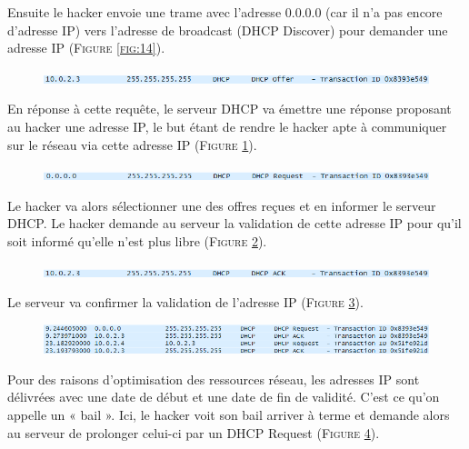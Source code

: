 \documentclass[11pt]{article}
\begin{document}
Ensuite le hacker envoie une trame avec l’adresse 0.0.0.0 (car il n’a pas encore d’adresse IP) vers l’adresse de broadcast (DHCP Discover) pour demander une adresse IP  (\textsc{Figure \ref{fig:14}}).

\begin{figure}[h!]
        \centering \includegraphics[scale=0.9]{Exo3/15.png}
        \caption{}
         \label{fig:15}
\end{figure}

En réponse à cette requête, le serveur DHCP va émettre une réponse proposant au hacker une adresse IP, le but étant de rendre le hacker apte à communiquer sur le réseau via cette adresse IP (\textsc{Figure \ref{fig:15}}).

\begin{figure}[h!]
        \centering \includegraphics[scale=0.9]{Exo3/16.png}
        \caption{}
        \label{fig:16}
\end{figure}

Le hacker va alors sélectionner une des offres reçues et en informer le serveur DHCP. Le hacker demande au serveur la validation de cette adresse IP pour qu’il soit informé qu’elle n’est plus libre (\textsc{Figure \ref{fig:16}}).
\vspace{0cm}
\begin{figure}[h!]
        \centering \includegraphics[scale=0.9]{Exo3/17.png}
        \caption{}
         \label{fig:17}
\end{figure}

Le serveur va confirmer la validation de l’adresse IP (\textsc{Figure \ref{fig:17}}).

\begin{figure}[h!]
        \centering \includegraphics[scale=0.8]{Exo3/18.png}
        \caption{}
         \label{fig:18}
\end{figure}

Pour des raisons d’optimisation des ressources réseau, les adresses IP sont délivrées avec une date de début et une date de fin de validité. C’est ce qu’on appelle un « bail ». Ici, le hacker voit son bail arriver à terme et demande alors au serveur de prolonger celui-ci par un DHCP Request (\textsc{Figure \ref{fig:18}}).
\end{document}
